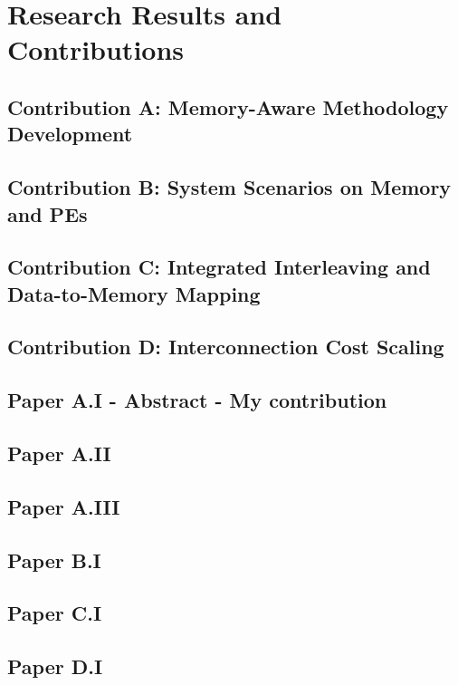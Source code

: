 \chapter{Research Results and Contributions}
\label{research}

\section{Contribution A: Memory-Aware Methodology Development}

\section{Contribution B: System Scenarios on Memory and PEs}

\section{Contribution C: Integrated Interleaving and Data-to-Memory Mapping}

\section{Contribution D: Interconnection Cost Scaling}

\section{Paper A.I - Abstract - My contribution}

\section{Paper A.II}

\section{Paper A.III}

\section{Paper B.I}

\section{Paper C.I}

\section{Paper D.I}
